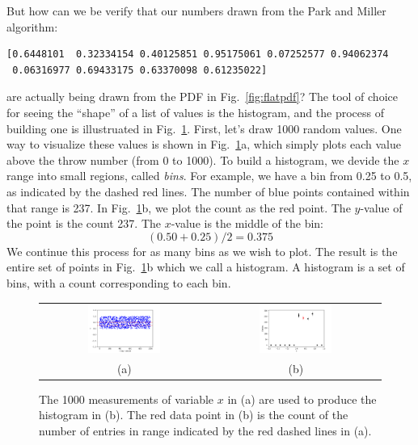 {But how can we be verify that our numbers drawn from the Park and Miller algorithm:
\begin{verbatim}
[0.6448101  0.32334154 0.40125851 0.95175061 0.07252577 0.94062374
 0.06316977 0.69433175 0.63370098 0.61235022]
\end{verbatim}
are actually being drawn from the PDF in Fig.~\ref{fig:flatpdf}?  The
tool of choice for seeing the ``shape'' of a list of values is the
histogram, and the process of building one is illustruated in
Fig.~\ref{fig:histeg}.  First, let's draw 1000 random values.  One way
to visualize these values is shown in Fig.~\ref{fig:histeg}a, which
simply plots each value above the throw number (from 0 to 1000).  To
build a histogram, we devide the $x$ range into small regions, called
{\em bins}.  For example, we have a bin from 0.25 to 0.5, as indicated
by the dashed red lines.  The number of blue points contained within
that range is 237.  In Fig.~\ref{fig:histeg}b, we plot the count as
the red point.  The $y$-value of the point is the count 237.  The
$x$-value is the middle of the bin:
\begin{displaymath}
(0.50+0.25)/2 = 0.375
\end{displaymath}
We continue this process for as many bins as we wish to plot.  The
result is the entire set of points in Fig.~\ref{fig:histeg}b which we
call a histogram.  A histogram is a set of bins, with a count
corresponding to each bin.

\begin{figure}[htbp]
\begin{center}
\begin{tabular}{cc}
{\includegraphics[width=0.45\textwidth]{figs/hist/throwflat.pdf}} &
{\includegraphics[width=0.45\textwidth]{figs/hist/flathist.pdf}} \\
(a) & (b) \\
\end{tabular}
\end{center}
\caption{\label{fig:histeg} The 1000 measurements of variable $x$ in (a) are used to produce the histogram in (b).  The red data point in (b) is the count of the number of entries in range indicated by the red dashed lines in (a).}
\end{figure}

}
